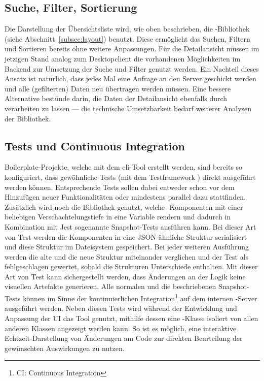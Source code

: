 \subsection{Suche, Filter, Sortierung}
Die Darstellung der Übersichtsliste wird, wie oben beschrieben, die -Bibliothek  (siehe Abschnitt~\ref{subsec:layout}) benutzt. Diese ermöglicht das Suchen, Filtern und Sortieren bereits ohne weitere Anpassungen. Für die Detailansicht müssen im jetzigen Stand analog zum Desktopclient die vorhandenen Möglichkeiten im Backend zur Umsetzung der Suche und Filter genutzt werden. Ein Nachteil dieses Ansatz ist natürlich, dass jedes Mal eine Anfrage an den Server geschickt werden und alle (gefilterten) Daten neu übertragen werden müssen. Eine bessere Alternative bestünde darin, die Daten der Detailansicht ebenfalls durch  verarbeiten zu lassen --- die technische Umsetzbarkeit bedarf weiterer Analysen der Bibliothek.

\subsection{Tests und Continuous Integration}\label{subsec:test_ci_concept}
Boilerplate-Projekte, welche mit dem \gls{cli}-Tool  erstellt werden, sind bereits so konfiguriert, dass gewöhnliche Tests (mit dem Testframework ) direkt ausgeführt werden können. Entsprechende Tests sollen dabei entweder schon vor dem Hinzufügen neuer Funktionalitäten oder mindestens parallel dazu stattfinden. Zusätzlich wird noch die Bibliothek  genutzt, welche -Komponenten mit einer beliebigen Verschachtelungstiefe in eine Variable rendern und dadurch in Kombination mit Jest sogenannte Snapshot-Tests ausführen kann. Bei dieser Art von Test werden die Komponenten in eine JSON-ähnliche Struktur serialisiert und diese Struktur im Dateisystem gespeichert. Bei jeder weiteren Ausführung werden die alte und die neue Struktur miteinander verglichen und der Test als fehlgeschlagen gewertet, sobald die Strukturen Unterschiede enthalten. Mit dieser Art von Test kann sichergestellt werden, dass Änderungen an der Logik keine visuellen Artefakte generieren. Alle normalen und die beschriebenen Snapshot-Tests können im Sinne der kontinuierlichen Integration\footnote{CI: Continuous Integration} auf dem internen -Server ausgeführt werden.
Neben diesen Tests wird während der Entwicklung und Anpassung der UI das Tool  genutzt, mithilfe dessen eine -Klasse isoliert von allen anderen Klassen angezeigt werden kann. So ist es möglich, eine interaktive Echtzeit-Darstellung von Änderungen am Code zur direkten Beurteilung der gewünschten Auswirkungen zu nutzen.

